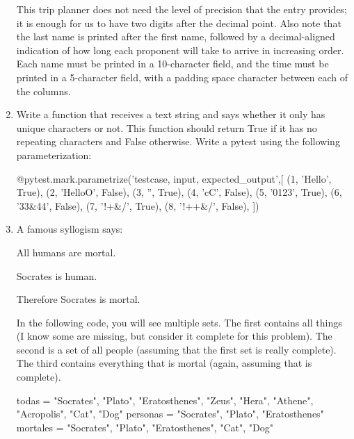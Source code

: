 \documentclass[
  fontsize=10pt,
  a4paper,
]{scrartcl}
\newcommand\solucion[1]{}
\begin{document}
\begin{enumerate}
This trip planner does not need the level of precision that the entry provides; it is enough for us to have two digits after the decimal point. Also note that the last name is printed after the first name, followed by a decimal-aligned indication of how long each proponent will take to arrive in increasing order. Each name must be printed in a 10-character field, and the time must be printed in a 5-character field, with a padding space character between each of the columns.


\item Write a function that receives a text string and says whether it only has unique characters or not. This function should return True if it has no repeating characters and False otherwise. Write a pytest using the following parameterization:

\begin{python}
@pytest.mark.parametrize('testcase, input, expected_output',[
    (1, 'Hello', True),
    (2, 'HelloO', False),
    (3, '', True),
    (4, 'cC', False),
    (5, '0123', True),
    (6, '33&44', False),
    (7, '!+&/', True),
    (8, '!++&/', False),
    ])
\end{python}

\solucion{
def is_unique(given_string):
    #creating an empty set
    chars_set = set()
    for char in given_string:
        #if char already in set its duplicate
        if char in chars_set:
            return False
        else:
            #char not in set, add it
            chars_set.add(char)
    #if no duplicates
    return True
    }
    

\item A famous syllogism says:

All humans are mortal.

Socrates is human.

Therefore Socrates is mortal.

In the following code, you will see multiple sets. The first contains all things (I know some are missing, but consider it complete for this problem). The second is a set of all people (assuming that the first set is really complete). The third contains everything that is mortal (again, assuming that is complete).

\begin{python}
todas = { "Socrates", "Plato", "Eratosthenes", "Zeus", "Hera",
          "Athene", "Acropolis", "Cat", "Dog" }
personas = { "Socrates", "Plato", "Eratosthenes" }
mortales = { "Socrates", "Plato", "Eratosthenes", "Cat", "Dog" }
\end{python}



\end{enumerate}
\end{document}
